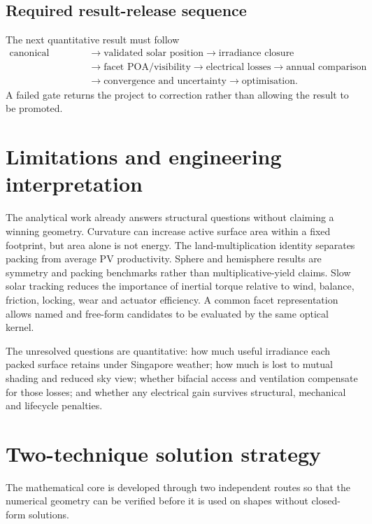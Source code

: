 \documentclass[11pt,a4paper]{article}
\begin{document}
\subsection{Required result-release sequence}
The next quantitative result must follow
\begin{equation}
\begin{aligned}
\text{canonical weather} &\rightarrow \text{validated solar position}
\rightarrow \text{irradiance closure}\\
&\rightarrow \text{facet POA/visibility}
\rightarrow \text{electrical losses}
\rightarrow \text{annual comparison}\\
&\rightarrow \text{convergence and uncertainty}
\rightarrow \text{optimisation}.
\end{aligned}
\end{equation}
A failed gate returns the project to correction rather than allowing the result to be promoted.

\section{Limitations and engineering interpretation}
The analytical work already answers structural questions without claiming a winning geometry. Curvature can increase active surface area within a fixed footprint, but area alone is not energy. The land-multiplication identity separates packing from average PV productivity. Sphere and hemisphere results are symmetry and packing benchmarks rather than multiplicative-yield claims. Slow solar tracking reduces the importance of inertial torque relative to wind, balance, friction, locking, wear and actuator efficiency. A common facet representation allows named and free-form candidates to be evaluated by the same optical kernel.

The unresolved questions are quantitative: how much useful irradiance each packed surface retains under Singapore weather; how much is lost to mutual shading and reduced sky view; whether bifacial access and ventilation compensate for those losses; and whether any electrical gain survives structural, mechanical and lifecycle penalties.

\section{Two-technique solution strategy}
The mathematical core is developed through two independent routes so that the numerical geometry can be verified before it is used on shapes without closed-form solutions.
\end{document}
